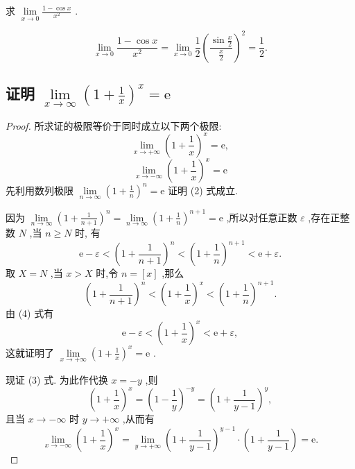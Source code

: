 \begin{example}
求 \(\mathop{\lim }\limits_{{x \rightarrow  0}}\frac{1 - \cos x}{{x}^{2}}\) .
\end{example}


\begin{solution}
\[
\mathop{\lim }\limits_{{x \rightarrow  0}}\frac{1 - \cos x}{{x}^{2}} = \mathop{\lim }\limits_{{x \rightarrow  0}}\frac{1}{2}{\left( \frac{\sin \frac{x}{2}}{\frac{x}{2}}\right) }^{2} = \frac{1}{2}.
\]

\end{solution}


\subsection{证明 \(\mathop{\lim }\limits_{{x \rightarrow  \infty }}{\left( 1 + \frac{1}{x}\right) }^{x} = \mathrm{e}\)}
\begin{proof}
所求证的极限等价于同时成立以下两个极限:
\[
\mathop{\lim }\limits_{{x \rightarrow   + \infty }}{\left( 1 + \frac{1}{x}\right) }^{x} = \mathrm{e}, \tag{2}
\]
\[
\mathop{\lim }\limits_{{x \rightarrow   - \infty }}{\left( 1 + \frac{1}{x}\right) }^{x} = \mathrm{e} \tag{3}
\]
先利用数列极限 \(\mathop{\lim }\limits_{{n \rightarrow  \infty }}{\left( 1 + \frac{1}{n}\right) }^{n} = \mathrm{e}\) 证明 (2) 式成立.

因为 \(\mathop{\lim }\limits_{{n \rightarrow  \infty }}{\left( 1 + \frac{1}{n + 1}\right) }^{n} = \mathop{\lim }\limits_{{n \rightarrow  \infty }}{\left( 1 + \frac{1}{n}\right) }^{n + 1} = \mathrm{e}\) ,所以对任意正数 \(\varepsilon\) ,存在正整数 \(N\) ,当 \(n \geq  N\) 时, 有
\[
\mathrm{e} - \varepsilon  < {\left( 1 + \frac{1}{n + 1}\right) }^{n} < {\left( 1 + \frac{1}{n}\right) }^{n + 1} < \mathrm{e} + \varepsilon . \tag{4}
\]
取 \(X = N\) ,当 \(x > X\) 时,令 \(n = \left\lbrack  x\right\rbrack\) ,那么
\[
{\left( 1 + \frac{1}{n + 1}\right) }^{n} < {\left( 1 + \frac{1}{x}\right) }^{x} < {\left( 1 + \frac{1}{n}\right) }^{n + 1}.
\]
由 (4) 式有
\[
\mathrm{e} - \varepsilon  < {\left( 1 + \frac{1}{x}\right) }^{x} < \mathrm{e} + \varepsilon ,
\]
这就证明了 \(\mathop{\lim }\limits_{{x \rightarrow   + \infty }}{\left( 1 + \frac{1}{x}\right) }^{x} = \mathrm{e}\) .

现证 (3) 式. 为此作代换 \(x =  - y\) ,则
\[
{\left( 1 + \frac{1}{x}\right) }^{x} = {\left( 1 - \frac{1}{y}\right) }^{-y} = {\left( 1 + \frac{1}{y - 1}\right) }^{y},
\]
且当 \(x \rightarrow   - \infty\) 时 \(y \rightarrow   + \infty\) ,从而有
\[
\mathop{\lim }\limits_{{x \rightarrow   - \infty }}{\left( 1 + \frac{1}{x}\right) }^{x} = \mathop{\lim }\limits_{{y \rightarrow   + \infty }}{\left( 1 + \frac{1}{y - 1}\right) }^{y - 1} \cdot  \left( {1 + \frac{1}{y - 1}}\right)  = \mathrm{e}.
\]
\end{proof}

